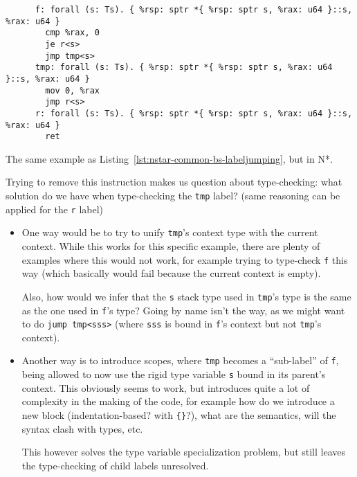 \begin{listing}[htb]
  \centering
  \begin{minipage}{0.90\textwidth}
    \begin{verbatim}
      f: forall (s: Ts). { %rsp: sptr *{ %rsp: sptr s, %rax: u64 }::s, %rax: u64 }
        cmp %rax, 0
        je r<s>
        jmp tmp<s>
      tmp: forall (s: Ts). { %rsp: sptr *{ %rsp: sptr s, %rax: u64 }::s, %rax: u64 }
        mov 0, %rax
        jmp r<s>
      r: forall (s: Ts). { %rsp: sptr *{ %rsp: sptr s, %rax: u64 }::s, %rax: u64 }
        ret
    \end{verbatim}
  \end{minipage}
  \caption{The same example as Listing~\ref{lst:nstar-common-bs-labeljumping}, but in N*.}
  \label{lst:nstar-common-bs-labeljumping2}
\end{listing}

Trying to remove this instruction makes us question about type-checking: what solution do we have when type-checking the \texttt{tmp} label? (same reasoning can be applied for the \texttt{r} label)
\begin{itemize}
  \item
        One way would be to try to unify \texttt{tmp}'s context type with the current context.
        While this works for this specific example, there are plenty of examples where this would not work, for example trying to type-check \texttt{f} this way (which basically would fail because the current context is empty).

        Also, how would we infer that the \texttt{s} stack type used in \texttt{tmp}'s type is the same as the one used in \texttt{f}'s type?
        Going by name isn't the way, as we might want to do \texttt{jump tmp<sss>} (where \texttt{sss} is bound in \texttt{f}'s context but not \texttt{tmp}'s context).
  \item
        Another way is to introduce scopes, where \texttt{tmp} becomes a ``sub-label'' of \texttt{f}, being allowed to now use the rigid type variable \texttt{s} bound in its parent's context.
        This obviously seems to work, but introduces quite a lot of complexity in the making of the code, for example how do we introduce a new block (indentation-based? with \texttt{\{\}}?), what are the semantics, will the syntax clash with types, etc.

        This however solves the type variable specialization problem, but still leaves the type-checking of child labels unresolved.
\end{itemize}

